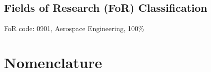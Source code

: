 \subsection*{Fields of Research (FoR) Classification}

  FoR code: 0901, Aerospace Engineering, 100\%

\tableofcontents

\listoffigures
{}
\listoftables
{}

\newpage
\section*{Nomenclature}


